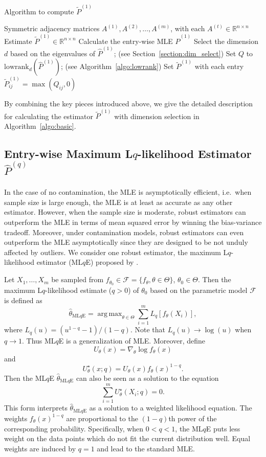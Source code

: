 \documentclass[a4paper]{article}
\DeclareMathOperator*{\argmax}{arg\,max}
\renewcommand{\hat}{\widehat}
\begin{document}
\begin{algorithm}[H]
\caption{Algorithm to compute $\widetilde{P}^{(1)}$}
\label{algo:basic}
\begin{algorithmic}[1]
\REQUIRE Symmetric adjacency matrices $A^{(1)}, A^{(2)}, \dotsc, A^{(m)}$, with each $A^{(t)} \in \mathbb{R}^{n \times n}$
\ENSURE Estimate $\widetilde{P}^{(1)} \in \mathbb{R}^{n \times n}$
\STATE Calculate the entry-wise MLE $\hat{P}^{(1)}$
\STATE Select the dimension $d$ based on the eigenvalues of $\hat{P}^{(1)}$; (see Section~\ref{section:dim_select})
\STATE Set $Q$ to $\mathrm{lowrank}_d(\hat{P}^{(1)})$; (see Algorithm~\ref{algo:lowrank})
\STATE Set $\widetilde{P}^{(1)}$ with each entry $\widetilde{P}^{(1)}_{ij} = \max(Q_{ij}, 0)$
\end{algorithmic}
\end{algorithm}


By combining the key pieces introduced above, we give the detailed description for calculating the estimator $\widetilde{P}^{(1)}$ with dimension selection in Algorithm~\ref{algo:basic}.




\subsection{Entry-wise Maximum L$q$-likelihood Estimator $\hat{P}^{(q)}$}

In the case of no contamination, the MLE is asymptotically efficient, i.e.\ when sample size is large enough, the MLE is at least as accurate as any other estimator. However, when the sample size is moderate, robust estimators can outperform the MLE in terms of mean squared error by winning the bias-variance tradeoff. Moreover, under contamination models, robust estimators can even outperform the MLE asymptotically since they are designed to be not unduly affected by outliers. We consider one robust estimator, the maximum L$q$-likelihood estimator (ML$q$E) proposed by \citet{ferrari2010maximum}.

Let $X_1, \dotsc, X_m$ be sampled from $f_{\theta_0} \in \mathcal{F} = \{ f_{\theta}, \theta \in \Theta \}$, $\theta_0 \in \Theta$. Then the maximum L$q$-likelihood estimate ($q > 0$) of $\theta_0$ based on the parametric model $\mathcal{F}$ is defined as
\[
	\hat{\theta}_{\mathrm{ML}q\mathrm{E}} = \argmax_{\theta \in \Theta} \sum_{i=1}^m L_q[f_{\theta}(X_i)],
\]
where $L_q(u) = (u^{1-q} - 1)/(1- q)$.
Note that $L_q(u) \to \log(u)$ when $q \to 1$. Thus ML$q$E is a generalization of MLE.
Moreover, define
\[
	U_{\theta}(x) = \nabla_{\theta} \log f_{\theta}(x)
\]
and
\[
	U^{\star}_{\theta}(x; q) = U_{\theta}(x) f_{\theta}(x)^{1-q}.
\]
Then the ML$q$E $\hat{\theta}_{\mathrm{ML}q\mathrm{E}}$ can also be seen as a solution to the equation
\[
	\sum_{i=1}^m U^{\star}_{\theta}(X_i; q) = 0.
\]
This form interprets $\hat{\theta}_{\mathrm{ML}q\mathrm{E}}$ as a solution to a weighted likelihood equation. The weights $f_{\theta}(x)^{1-q}$ are proportional to the $(1-q)$th power of the corresponding probability. Specifically, when $0 < q < 1$, the ML$q$E puts less weight on the data points which do not fit the current distribution well. Equal weights are induced by $q=1$ and lead to the standard MLE.
\end{document}
